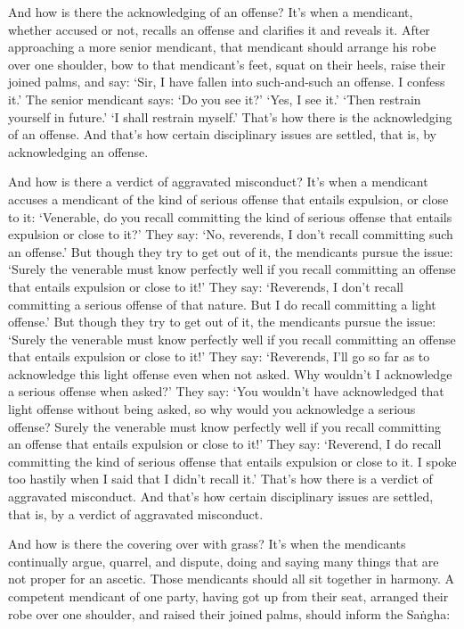 \documentclass[12pt,openany]{book}%
\begin{document}
And how is there the acknowledging of an offense? It’s when a mendicant, whether accused or not, recalls an offense and clarifies it and reveals it. After approaching a more senior mendicant, that mendicant should arrange his robe over one shoulder, bow to that mendicant’s feet, squat on their heels, raise their joined palms, and say: ‘Sir, I have fallen into such-and-such an offense. I confess it.’ The senior mendicant says: ‘Do you see it?’ ‘Yes, I see it.’ ‘Then restrain yourself in future.’ ‘I shall restrain myself.’ That’s how there is the acknowledging of an offense. And that’s how certain disciplinary issues are settled, that is, by acknowledging an offense. 

And how is there a verdict of aggravated misconduct? It’s when a mendicant accuses a mendicant of the kind of serious offense that entails expulsion, or close to it: ‘Venerable, do you recall committing the kind of serious offense that entails expulsion or close to it?’ They say: ‘No, reverends, I don’t recall committing such an offense.’ But though they try to get out of it, the mendicants pursue the issue: ‘Surely the venerable must know perfectly well if you recall committing an offense that entails expulsion or close to it!’ They say: ‘Reverends, I don’t recall committing a serious offense of that nature. But I do recall committing a light offense.’ But though they try to get out of it, the mendicants pursue the issue: ‘Surely the venerable must know perfectly well if you recall committing an offense that entails expulsion or close to it!’ They say: ‘Reverends, I’ll go so far as to acknowledge this light offense even when not asked. Why wouldn’t I acknowledge a serious offense when asked?’ They say: ‘You wouldn’t have acknowledged that light offense without being asked, so why would you acknowledge a serious offense? Surely the venerable must know perfectly well if you recall committing an offense that entails expulsion or close to it!’ They say: ‘Reverend, I do recall committing the kind of serious offense that entails expulsion or close to it. I spoke too hastily when I said that I didn’t recall it.’ That’s how there is a verdict of aggravated misconduct. And that’s how certain disciplinary issues are settled, that is, by a verdict of aggravated misconduct. 

And how is there the covering over with grass? It’s when the mendicants continually argue, quarrel, and dispute, doing and saying many things that are not proper for an ascetic. Those mendicants should all sit together in harmony. A competent mendicant of one party, having got up from their seat, arranged their robe over one shoulder, and raised their joined palms, should inform the \textsanskrit{Saṅgha}: 
\end{document}
